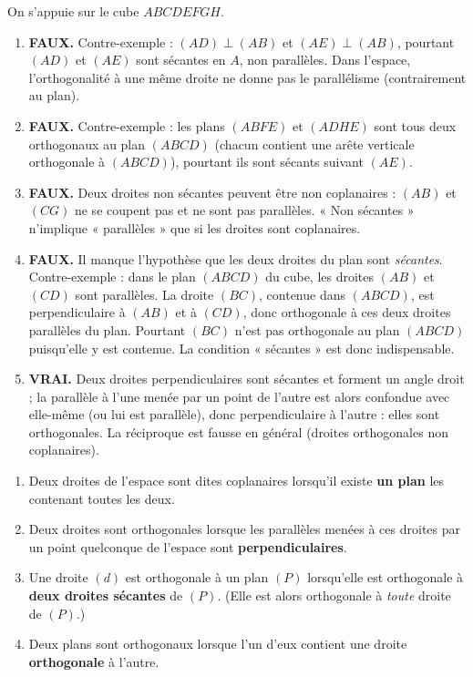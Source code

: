 \documentclass[11pt]{article}
\newcommand{\cle}[1]{{\popxbold\color{popdark}#1}}
\begin{document}
\begin{corrige}
On s'appuie sur le cube $ABCDEFGH$.
\begin{enumerate}
\item \textbf{FAUX.} Contre-exemple : $(AD) \perp (AB)$ et $(AE) \perp (AB)$, pourtant $(AD)$ et $(AE)$ sont sécantes en $A$, non parallèles. Dans l'espace, l'orthogonalité à une même droite ne donne pas le parallélisme (contrairement au plan).
\item \textbf{FAUX.} Contre-exemple : les plans $(ABFE)$ et $(ADHE)$ sont tous deux orthogonaux au plan $(ABCD)$ (chacun contient une arête verticale orthogonale à $(ABCD)$), pourtant ils sont sécants suivant $(AE)$.
\item \textbf{FAUX.} Deux droites non sécantes peuvent être non coplanaires : $(AB)$ et $(CG)$ ne se coupent pas et ne sont pas parallèles. « Non sécantes » n'implique « parallèles » que si les droites sont coplanaires.
\item \textbf{FAUX.} Il manque l'hypothèse que les deux droites du plan sont \emph{sécantes}. Contre-exemple : dans le plan $(ABCD)$ du cube, les droites $(AB)$ et $(CD)$ sont parallèles. La droite $(BC)$, contenue dans $(ABCD)$, est perpendiculaire à $(AB)$ et à $(CD)$, donc orthogonale à ces deux droites parallèles du plan. Pourtant $(BC)$ n'est pas orthogonale au plan $(ABCD)$ puisqu'elle y est contenue. La condition « sécantes » est donc indispensable.
\item \textbf{VRAI.} Deux droites perpendiculaires sont sécantes et forment un angle droit ; la parallèle à l'une menée par un point de l'autre est alors confondue avec elle-même (ou lui est parallèle), donc perpendiculaire à l'autre : elles sont orthogonales. La réciproque est fausse en général (droites orthogonales non coplanaires).
\end{enumerate}
\end{corrige}

\begin{corrige}
\begin{enumerate}
\item Deux droites de l'espace sont dites \cle{coplanaires} lorsqu'il existe \textbf{un plan} les contenant toutes les deux.
\item Deux droites sont \cle{orthogonales} lorsque les parallèles menées à ces droites par un point quelconque de l'espace sont \textbf{perpendiculaires}.
\item Une droite $(d)$ est orthogonale à un plan $(P)$ lorsqu'elle est orthogonale à \textbf{deux droites sécantes} de $(P)$. (Elle est alors orthogonale à \emph{toute} droite de $(P)$.)
\item Deux plans sont \cle{orthogonaux} lorsque l'un d'eux contient une droite \textbf{orthogonale} à l'autre.
\end{enumerate}
\end{corrige}
\end{document}
